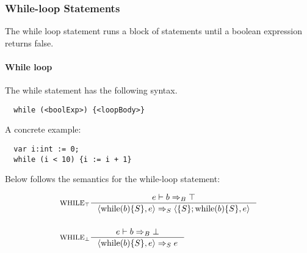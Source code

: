 \subsubsection{While-loop Statements}
\label{subsec:whileLoopStatements}

The while loop statement runs a block of statements until a boolean expression returns false.

\paragraph{While loop}
\label{sec:whileLoop}

The while statement has the following syntax.

\begin{verbatim}
  while (<boolExp>) {<loopBody>}
\end{verbatim}

A concrete example:

\begin{verbatim}
  var i:int := 0;
  while (i < 10) {i := i + 1}
\end{verbatim}

Below follows the semantics for the while-loop statement:

\begin{align*}
&\inference[$\text{WHILE}_\top$]{e \vdash b \Rightarrow_B \top}
                       {\Braket{\Twhile(b)\{S\},e} \Rightarrow_S \Braket{\{S\}; \Twhile (b)\{S\},e}}
\\\\
&\inference[$\text{WHILE}_\bot$]{e \vdash b \Rightarrow_B \bot}
                       {\Braket{\Twhile(b)\{S\},e} \Rightarrow_S e}
\end{align*}